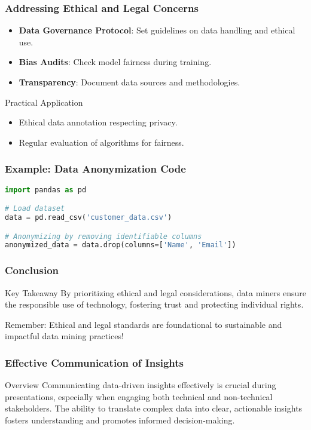\documentclass{beamer}
\begin{document}
\begin{frame}[fragile]
    \frametitle{Addressing Ethical and Legal Concerns}
    \begin{itemize}
        \item \textbf{Data Governance Protocol}: Set guidelines on data handling and ethical use.
        \item \textbf{Bias Audits}: Check model fairness during training.
        \item \textbf{Transparency}: Document data sources and methodologies.
    \end{itemize}

    \begin{block}{Practical Application}
        \begin{itemize}
            \item Ethical data annotation respecting privacy.
            \item Regular evaluation of algorithms for fairness.
        \end{itemize}
    \end{block}
\end{frame}

\begin{frame}[fragile]
    \frametitle{Example: Data Anonymization Code}
    \begin{lstlisting}[language=Python]
import pandas as pd

# Load dataset
data = pd.read_csv('customer_data.csv')

# Anonymizing by removing identifiable columns
anonymized_data = data.drop(columns=['Name', 'Email'])
    \end{lstlisting}
\end{frame}

\begin{frame}[fragile]
    \frametitle{Conclusion}
    \begin{block}{Key Takeaway}
        By prioritizing ethical and legal considerations, data miners ensure the responsible use of technology, fostering trust and protecting individual rights. 
    \end{block}
    Remember: Ethical and legal standards are foundational to sustainable and impactful data mining practices!
\end{frame}

\begin{frame}[fragile]
    \frametitle{Effective Communication of Insights}
    \begin{block}{Overview}
        Communicating data-driven insights effectively is crucial during presentations, especially when engaging both technical and non-technical stakeholders. The ability to translate complex data into clear, actionable insights fosters understanding and promotes informed decision-making.
    \end{block}
\end{frame}
\end{document}
